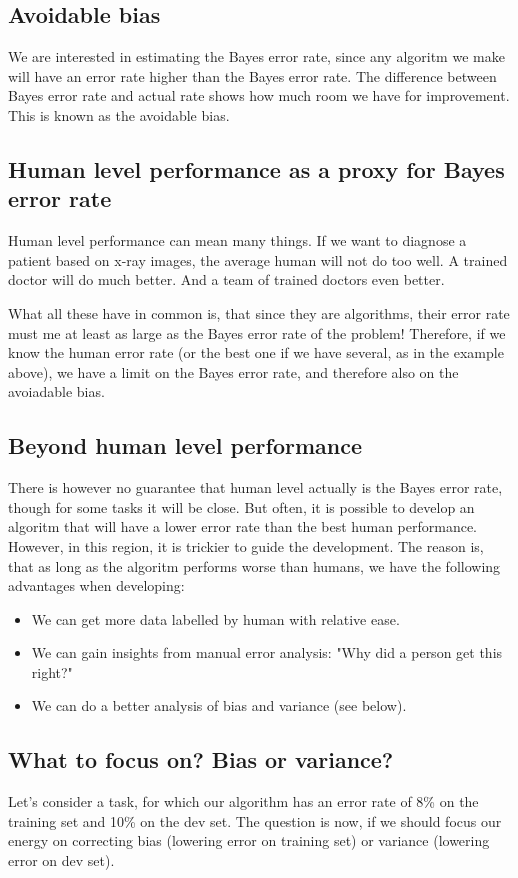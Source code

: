 \documentclass[12pt, a4paper]{article}
\numberwithin{equation}{section}
\begin{document}
\subsection{Avoidable bias}
We are interested in estimating the Bayes error rate, since any algoritm we make will have an error rate higher than the Bayes error rate. The difference between Bayes error rate and actual rate shows how much room we have for improvement. This is known as the avoidable bias.

\subsection{Human level performance as a proxy for Bayes error rate}
Human level performance can mean many things. If we want to diagnose a patient based on x-ray images, the average human will not do too well. A trained doctor will do much better. And a team of trained doctors even better.

What all these have in common is, that since they are algorithms, their error rate must me at least as large as the Bayes error rate of the problem! Therefore, if we know the human error rate (or the best one if we have several, as in the example above), we have a limit on the Bayes error rate, and therefore also on the avoiadable bias.

\subsection{Beyond human level performance}
There is however no guarantee that human level actually is the Bayes error rate, though for some tasks it will be close. But often, it is possible to develop an algoritm that will have a lower error rate than the best human performance. However, in this region, it is trickier to guide the development. The reason is, that as long as the algoritm performs worse than humans, we have the following advantages when developing:
\begin{itemize}
\item We can get more data labelled by human with relative ease.
\item We can gain insights from manual error analysis: "Why did a person get this right?"
\item We can do a better analysis of bias and variance (see below).
\end{itemize}

\subsection{What to focus on? Bias or variance?}
Let's consider a task, for which our algorithm has an error rate of 8\% on the training set and 10\% on the dev set. The question is now, if we should focus our energy on correcting bias (lowering error on training set) or variance (lowering error on dev set).
\end{document}
